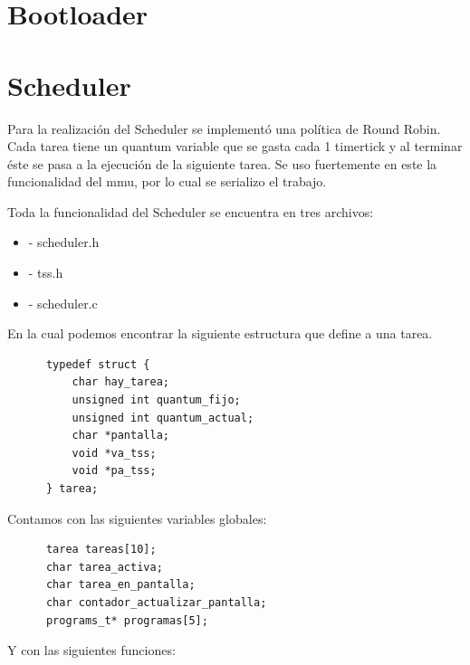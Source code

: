 \documentclass[a4paper,10pt]{article}
\begin{document}
\section{Bootloader}
\newpage


\newpage

\section{Scheduler}

Para la realizaci\'on del Scheduler se implement\'o una pol\'itica de Round Robin. Cada tarea tiene un quantum variable que se gasta cada 1 timertick y al terminar éste se pasa a la ejecuci\'on de la siguiente tarea.
Se uso fuertemente en este la funcionalidad del mmu, por lo cual se serializo el trabajo.

Toda la funcionalidad del Scheduler se encuentra en tres archivos:
\begin{itemize}
\item	- scheduler.h
\item	- tss.h
\item	- scheduler.c
\end{itemize}

En la cual podemos encontrar la siguiente estructura que define a una tarea.

\begin{verbatim}
      typedef struct {
          char hay_tarea;						
          unsigned int quantum_fijo;			
          unsigned int quantum_actual;		
          char *pantalla;					
          void *va_tss;						
          void *pa_tss;						
      } tarea;
\end{verbatim}

Contamos con las siguientes variables globales:

\begin{verbatim}
      tarea tareas[10];
      char tarea_activa;	
      char tarea_en_pantalla;
      char contador_actualizar_pantalla;
      programs_t* programas[5];
\end{verbatim}


Y con las siguientes funciones:
\end{document}
